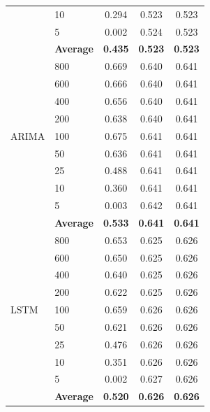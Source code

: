 \documentclass[11pt,a4paper]{article}
\begin{document}
\begin{table}[H]
\begin{tabular}{llccc}
 & 10  & 0.294 & 0.523 & 0.523 \\
 & 5   & 0.002 & 0.524 & 0.523 \\
 & \textbf{Average} & \textbf{0.435} & \textbf{0.523} & \textbf{0.523} \\
\midrule
\multirow{9}{*}{ARIMA}
 & 800 & 0.669 & 0.640 & 0.641 \\
 & 600 & 0.666 & 0.640 & 0.641 \\
 & 400 & 0.656 & 0.640 & 0.641 \\
 & 200 & 0.638 & 0.640 & 0.641 \\
 & 100 & 0.675 & 0.641 & 0.641 \\
 & 50  & 0.636 & 0.641 & 0.641 \\
 & 25  & 0.488 & 0.641 & 0.641 \\
 & 10  & 0.360 & 0.641 & 0.641 \\
 & 5   & 0.003 & 0.642 & 0.641 \\
 & \textbf{Average} & \textbf{0.533} & \textbf{0.641} & \textbf{0.641} \\
\midrule
\multirow{9}{*}{LSTM}
 & 800 & 0.653 & 0.625 & 0.626 \\
 & 600 & 0.650 & 0.625 & 0.626 \\
 & 400 & 0.640 & 0.625 & 0.626 \\
 & 200 & 0.622 & 0.625 & 0.626 \\
 & 100 & 0.659 & 0.626 & 0.626 \\
 & 50  & 0.621 & 0.626 & 0.626 \\
 & 25  & 0.476 & 0.626 & 0.626 \\
 & 10  & 0.351 & 0.626 & 0.626 \\
 & 5   & 0.002 & 0.627 & 0.626 \\
 & \textbf{Average} & \textbf{0.520} & \textbf{0.626} & \textbf{0.626} \\
\bottomrule
\end{tabular}
\end{table}
\end{document}
